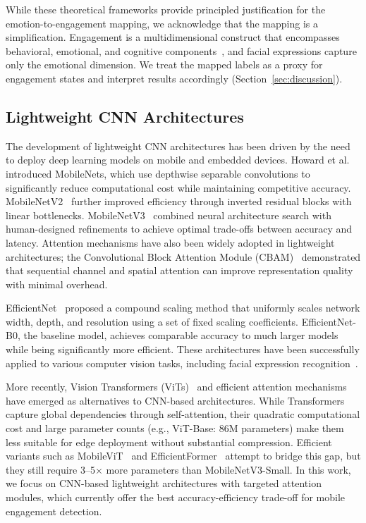 \documentclass[sensors,article,submit,pdftex,moreauthors]{Definitions/mdpi}
\begin{document}
While these theoretical frameworks provide principled justification for the emotion-to-engagement mapping, we acknowledge that the mapping is a simplification. Engagement is a multidimensional construct that encompasses behavioral, emotional, and cognitive components~\cite{fredricks2004school}, and facial expressions capture only the emotional dimension. We treat the mapped labels as a proxy for engagement states and interpret results accordingly (Section~\ref{sec:discussion}).

\subsection{Lightweight CNN Architectures}

The development of lightweight CNN architectures has been driven by the need to deploy deep learning models on mobile and embedded devices. Howard et al.~\cite{howard2017mobilenets} introduced MobileNets, which use depthwise separable convolutions to significantly reduce computational cost while maintaining competitive accuracy. MobileNetV2~\cite{sandler2018mobilenetv2} further improved efficiency through inverted residual blocks with linear bottlenecks. MobileNetV3~\cite{howard2019mobilenetv3} combined neural architecture search with human-designed refinements to achieve optimal trade-offs between accuracy and latency. Attention mechanisms have also been widely adopted in lightweight architectures; the Convolutional Block Attention Module (CBAM)~\cite{woo2018cbam} demonstrated that sequential channel and spatial attention can improve representation quality with minimal overhead.

EfficientNet~\cite{tan2019efficientnet} proposed a compound scaling method that uniformly scales network width, depth, and resolution using a set of fixed scaling coefficients. EfficientNet-B0, the baseline model, achieves comparable accuracy to much larger models while being significantly more efficient. These architectures have been successfully applied to various computer vision tasks, including facial expression recognition~\cite{podder2022time,chen2023resnet}.

More recently, Vision Transformers (ViTs)~\cite{dosovitskiy2021vit} and efficient attention mechanisms have emerged as alternatives to CNN-based architectures. While Transformers capture global dependencies through self-attention, their quadratic computational cost and large parameter counts (e.g., ViT-Base: 86M parameters) make them less suitable for edge deployment without substantial compression. Efficient variants such as MobileViT~\cite{mehta2022mobilevit} and EfficientFormer~\cite{li2022efficientformer} attempt to bridge this gap, but they still require 3--5$\times$ more parameters than MobileNetV3-Small. In this work, we focus on CNN-based lightweight architectures with targeted attention modules, which currently offer the best accuracy-efficiency trade-off for mobile engagement detection.
\end{document}
